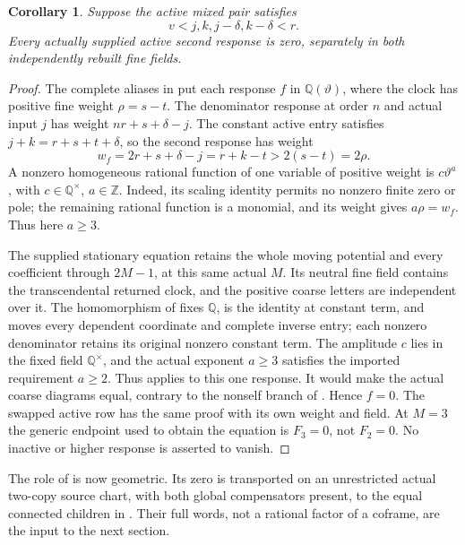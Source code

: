 \documentclass[11pt,a4paper]{amsart}
\numberwithin{equation}{section}
\theoremstyle{plain}
\newtheorem{corollary}[theorem]{Corollary}
\theoremstyle{definition}
\newcommand{\Z}{\mathbb Z}
\newcommand{\Q}{\mathbb Q}
\begin{document}
\begin{corollary}\label{ph:vanishing}
Suppose the active mixed pair satisfies
\begin{equation}\label{ph:private-two}
 v<j,k,j-\delta,k-\delta<r.
\end{equation}
Every actually supplied active second response is zero, separately in
both independently rebuilt fine fields.
\end{corollary}
\begin{proof}
The complete aliases in  put each response
\(f\) in \(\Q(\vartheta)\), where the clock has positive fine weight
\(\rho=s-t\).  The denominator response at order \(n\) and actual
input \(j\) has weight \(nr+s+\delta-j\).  The constant active entry
satisfies \(j+k=r+s+t+\delta\), so the second response has weight
\[
 w_f=2r+s+\delta-j=r+k-t>2(s-t)=2\rho.
\]
A nonzero homogeneous rational function of one variable of positive
weight is \(c\vartheta^a\), with \(c\in\Q^\times\), \(a\in\Z\).
Indeed, its scaling identity permits no nonzero finite zero or pole;
the remaining rational function is a monomial, and its weight gives
\(a\rho=w_f\).  Thus here \(a\ge3\).

The supplied stationary equation retains the whole moving potential
and every coefficient through \(2M-1\), at this same actual \(M\).
Its neutral fine field contains the transcendental returned clock, and
the positive coarse letters are independent over it.  The homomorphism
of  fixes \(\Q\), is the identity at constant
term, and moves every dependent coordinate and complete inverse entry;
each nonzero denominator retains its original nonzero constant term.
The amplitude \(c\) lies in the fixed field \(\Q^\times\), and the
actual exponent \(a\ge3\) satisfies the imported requirement \(a\ge2\).
Thus \cite[Whole moving potential]{Shields2026Coframes} applies to this
one response.  It would make the actual coarse diagrams equal, contrary
to the nonself branch of .  Hence \(f=0\).
The swapped active row has the same proof with its own weight and field.
At \(M=3\) the generic endpoint used to obtain the equation is
\(F_3=0\), not \(F_2=0\).  No inactive or higher response is
asserted to vanish.
\end{proof}

The role of  is now geometric.  Its zero is transported
on an unrestricted actual two-copy source chart, with both global
compensators present, to the equal connected children in
.  Their full words, not a rational factor of a
coframe, are the input to the next section.
\end{document}
